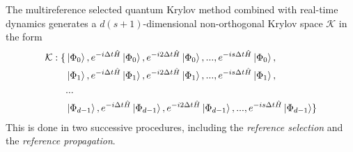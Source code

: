 \documentclass[journal=jctcce,manuscript=article]{achemso}
\newcommand{\methodname}[0]{multireference selected quantum Krylov\xspace}
\begin{document}
The \methodname method combined with real-time dynamics generates a $d(s+1)$-dimensional non-orthogonal Krylov space $\mathcal{K}$ in the form 
\begin{equation}
\begin{split}
\label{krylov}
\mathcal{K} : \{ & \left\vert{\Phi_{0}}\right\rangle, e^{-i \Delta t \hat{H}} \left\vert{\Phi_{0}}\right\rangle, e^{-i 2 \Delta t \hat{H}} \left\vert{\Phi_{0}}\right\rangle, ... , e^{-i s\Delta t \hat{H}} \left\vert{\Phi_{0}}\right\rangle, \\
& \left\vert{\Phi_{1}}\right\rangle, e^{-i \Delta t \hat{H}} \left\vert{\Phi_{1}}\right\rangle, e^{-i 2 \Delta t \hat{H}} \left\vert{\Phi_{1}}\right\rangle, ... ,e^{-i s\Delta t \hat{H}} \left\vert{\Phi_{1}}\right\rangle, \\
& ... \\
& \left\vert{\Phi_{d-1}}\right\rangle, e^{-i \Delta t \hat{H}} \left\vert{\Phi_{d-1}}\right\rangle, e^{-i 2 \Delta t \hat{H}} \left\vert{\Phi_{d-1}}\right\rangle, ... ,e^{-i s\Delta t \hat{H}} \left\vert{\Phi_{d-1}}\right\rangle  \}  
\end{split}
\end{equation}
This is done in two successive procedures, including the \textit{reference selection} and the \textit{reference propagation}.
\end{document}

